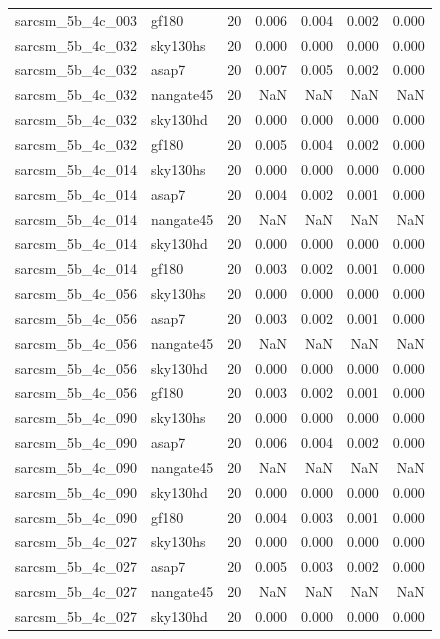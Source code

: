 \begin{tabular}{llrrrrr}
sarcsm\_5b\_4c\_003 & gf180 & 20 & 0.006 & 0.004 & 0.002 & 0.000 \\
sarcsm\_5b\_4c\_032 & sky130hs & 20 & 0.000 & 0.000 & 0.000 & 0.000 \\
sarcsm\_5b\_4c\_032 & asap7 & 20 & 0.007 & 0.005 & 0.002 & 0.000 \\
sarcsm\_5b\_4c\_032 & nangate45 & 20 & NaN & NaN & NaN & NaN \\
sarcsm\_5b\_4c\_032 & sky130hd & 20 & 0.000 & 0.000 & 0.000 & 0.000 \\
sarcsm\_5b\_4c\_032 & gf180 & 20 & 0.005 & 0.004 & 0.002 & 0.000 \\
sarcsm\_5b\_4c\_014 & sky130hs & 20 & 0.000 & 0.000 & 0.000 & 0.000 \\
sarcsm\_5b\_4c\_014 & asap7 & 20 & 0.004 & 0.002 & 0.001 & 0.000 \\
sarcsm\_5b\_4c\_014 & nangate45 & 20 & NaN & NaN & NaN & NaN \\
sarcsm\_5b\_4c\_014 & sky130hd & 20 & 0.000 & 0.000 & 0.000 & 0.000 \\
sarcsm\_5b\_4c\_014 & gf180 & 20 & 0.003 & 0.002 & 0.001 & 0.000 \\
sarcsm\_5b\_4c\_056 & sky130hs & 20 & 0.000 & 0.000 & 0.000 & 0.000 \\
sarcsm\_5b\_4c\_056 & asap7 & 20 & 0.003 & 0.002 & 0.001 & 0.000 \\
sarcsm\_5b\_4c\_056 & nangate45 & 20 & NaN & NaN & NaN & NaN \\
sarcsm\_5b\_4c\_056 & sky130hd & 20 & 0.000 & 0.000 & 0.000 & 0.000 \\
sarcsm\_5b\_4c\_056 & gf180 & 20 & 0.003 & 0.002 & 0.001 & 0.000 \\
sarcsm\_5b\_4c\_090 & sky130hs & 20 & 0.000 & 0.000 & 0.000 & 0.000 \\
sarcsm\_5b\_4c\_090 & asap7 & 20 & 0.006 & 0.004 & 0.002 & 0.000 \\
sarcsm\_5b\_4c\_090 & nangate45 & 20 & NaN & NaN & NaN & NaN \\
sarcsm\_5b\_4c\_090 & sky130hd & 20 & 0.000 & 0.000 & 0.000 & 0.000 \\
sarcsm\_5b\_4c\_090 & gf180 & 20 & 0.004 & 0.003 & 0.001 & 0.000 \\
sarcsm\_5b\_4c\_027 & sky130hs & 20 & 0.000 & 0.000 & 0.000 & 0.000 \\
sarcsm\_5b\_4c\_027 & asap7 & 20 & 0.005 & 0.003 & 0.002 & 0.000 \\
sarcsm\_5b\_4c\_027 & nangate45 & 20 & NaN & NaN & NaN & NaN \\
sarcsm\_5b\_4c\_027 & sky130hd & 20 & 0.000 & 0.000 & 0.000 & 0.000 \\

\end{tabular}
